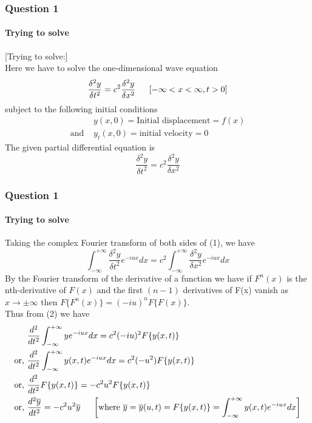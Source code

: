 \documentclass[9 pt]{beamer}
\begin{document}
\begin{frame}[fragile]
\frametitle{Question 1}
\framesubtitle{Trying to solve}
[Trying to solve:]  \\
Here we have to solve the one-dimensional wave equation
$$\frac{\delta^2y}{\delta t^2}=c^2\frac{\delta^2y}{\delta x^2} \hspace{0.5cm}\left[-\infty < x < \infty, t>0\right]$$
subject to the following initial conditions
\begin{align*}
&y(x,0)=\textrm{Initial displacement}=f(x) \\
\textrm{and }&y_t(x,0)=\textrm{initial velocity}=0
\end{align*}
The given partial differential equation is
\begin{equation}
\frac{\delta^2y}{\delta t^2}=c^2\frac{\delta^2y}{\delta x^2}
\end{equation}

\transfade[duration=0.6]
\end{frame}

\begin{frame}
\frametitle{Question 1}
\framesubtitle{Trying to solve}
Taking the complex Fourier transform of both sides of (1), we have
\begin{equation}
\int_{-\infty}^{+\infty}\frac{\delta^2y}{\delta t^2}e^{-iux} dx=c^2\int_{-\infty}^{+\infty}\frac{\delta^2y}{\delta x^2}e^{-iux} dx
\end{equation}
By the Fourier transform of the derivative of a function we have if $F^n(x)$ is the nth-derivative of $F(x)$ and the first $(n-1)$ derivatives of F(x) vanish as $x \rightarrow \pm \infty$ then $F\{F^n(x)\}=(-iu)^n F\{F(x)\}$. \\
Thus from (2) we have
\begin{align*}
&\frac{d^2}{dt^2}\int_{-\infty}^{+\infty}ye^{-iux} dx =c^2(-iu)^2F\{y(x,t)\} \\
\textrm{or, }&\frac{d^2}{dt^2}\int_{-\infty}^{+\infty}y(x,t)e^{-iux} dx =c^2(-u^2) F\{y(x,t)\} \\
\textrm{or, }&\frac{d^2}{dt^2}F\{y(x,t)\} =-c^2u^2 F\{y(x,t)\} \\
\textrm{or, }&\frac{d^2\overline{y}}{dt^2} =-c^2u^2\overline{y} \hspace{0.5cm}\left[\textrm{where }\overline{y}=\overline{y}(u,t)=F\{y(x,t)\}=\int_{-\infty}^{+\infty}y(x,t)e^{-iux} dx\right]
\end{align*}

\transwipe[duration=0.6]
\end{frame}
\end{document}
